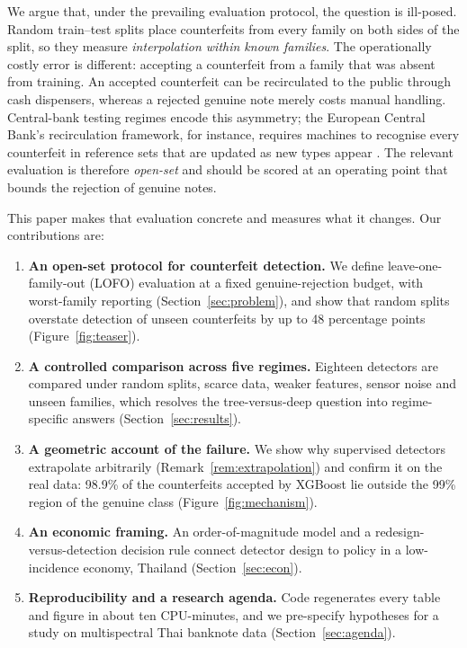 \documentclass{article}
\theoremstyle{definition}
\theoremstyle{remark}
\begin{document}
We argue that, under the prevailing evaluation protocol, the question is ill-posed. Random train--test splits place counterfeits from every family on both sides of the split, so they measure \emph{interpolation within known families}. The operationally costly error is different: accepting a counterfeit from a family that was absent from training. An accepted counterfeit can be recirculated to the public through cash dispensers, whereas a rejected genuine note merely costs manual handling. Central-bank testing regimes encode this asymmetry; the European Central Bank's recirculation framework, for instance, requires machines to recognise every counterfeit in reference sets that are updated as new types appear \citep{ecb2010decision}. The relevant evaluation is therefore \emph{open-set} \citep{scheirer2013toward} and should be scored at an operating point that bounds the rejection of genuine notes.

This paper makes that evaluation concrete and measures what it changes. Our contributions are:
\begin{enumerate}[leftmargin=1.5em]
\item \textbf{An open-set protocol for counterfeit detection.} We define leave-one-family-out (LOFO) evaluation at a fixed genuine-rejection budget, with worst-family reporting (Section~\ref{sec:problem}), and show that random splits overstate detection of unseen counterfeits by up to 48 percentage points (Figure~\ref{fig:teaser}).
\item \textbf{A controlled comparison across five regimes.} Eighteen detectors are compared under random splits, scarce data, weaker features, sensor noise and unseen families, which resolves the tree-versus-deep question into regime-specific answers (Section~\ref{sec:results}).
\item \textbf{A geometric account of the failure.} We show why supervised detectors extrapolate arbitrarily (Remark~\ref{rem:extrapolation}) and confirm it on the real data: 98.9\% of the counterfeits accepted by XGBoost lie outside the 99\% region of the genuine class (Figure~\ref{fig:mechanism}).
\item \textbf{An economic framing.} An order-of-magnitude model and a redesign-versus-detection decision rule connect detector design to policy in a low-incidence economy, Thailand (Section~\ref{sec:econ}).
\item \textbf{Reproducibility and a research agenda.} Code regenerates every table and figure in about ten CPU-minutes, and we pre-specify hypotheses for a study on multispectral Thai banknote data (Section~\ref{sec:agenda}).
\end{enumerate}
\end{document}
